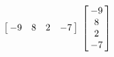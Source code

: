 {$\left[\hskip -3pt \begin{array}{cccc} -9&8&2&-7\end{array}\hskip -3pt \right] $}
{$ \left[\hskip -3pt \begin{array}{c} -9\\  8\\  2
\\  -7\end{array}\hskip -3pt \right]$}



